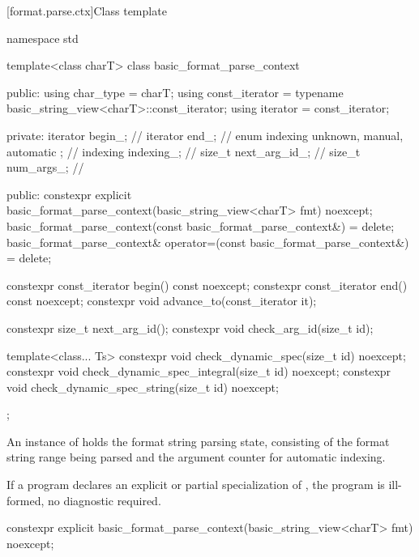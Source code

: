 [format.parse.ctx]{Class template }

%
%
%
%
\begin{codeblock}
namespace std {
  template<class charT>
  class basic_format_parse_context {
  public:
    using char_type = charT;
    using const_iterator = typename basic_string_view<charT>::const_iterator;
    using iterator = const_iterator;

  private:
    iterator begin_;                                    // \expos
    iterator end_;                                      // \expos
    enum indexing { unknown, manual, automatic };       // \expos
    indexing indexing_;                                 // \expos
    size_t next_arg_id_;                                // \expos
    size_t num_args_;                                   // \expos

  public:
    constexpr explicit basic_format_parse_context(basic_string_view<charT> fmt) noexcept;
    basic_format_parse_context(const basic_format_parse_context&) = delete;
    basic_format_parse_context& operator=(const basic_format_parse_context&) = delete;

    constexpr const_iterator begin() const noexcept;
    constexpr const_iterator end() const noexcept;
    constexpr void advance_to(const_iterator it);

    constexpr size_t next_arg_id();
    constexpr void check_arg_id(size_t id);

    template<class... Ts>
      constexpr void check_dynamic_spec(size_t id) noexcept;
    constexpr void check_dynamic_spec_integral(size_t id) noexcept;
    constexpr void check_dynamic_spec_string(size_t id) noexcept;
  };
}
\end{codeblock}

\pnum
An instance of  holds
the format string parsing state, consisting of
the format string range being parsed and
the argument counter for automatic indexing.

\pnum
If a program declares an explicit or partial specialization of
,
the program is ill-formed, no diagnostic required.

%
\begin{itemdecl}
constexpr explicit basic_format_parse_context(basic_string_view<charT> fmt) noexcept;
\end{itemdecl}

